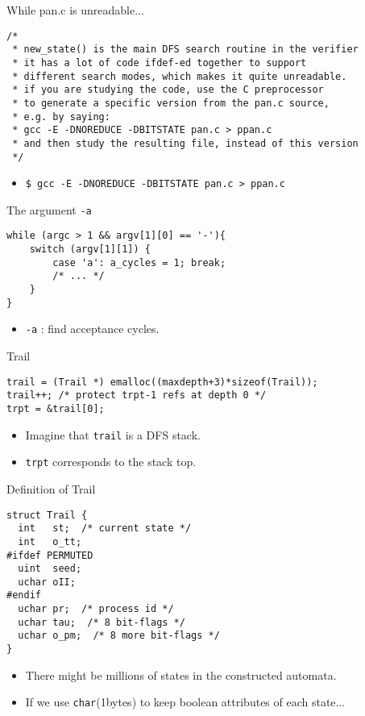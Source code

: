 \documentclass[12pt]{beamer}
\newcommand{\code}[1]{\texttt{#1}}
\begin{document}
\begin{frame}[fragile]{While pan.c is unreadable...}

\begin{lstlisting}[basicstyle=\footnotesize\ttfamily]
/*
 * new_state() is the main DFS search routine in the verifier
 * it has a lot of code ifdef-ed together to support
 * different search modes, which makes it quite unreadable.
 * if you are studying the code, use the C preprocessor
 * to generate a specific version from the pan.c source,
 * e.g. by saying:
 * gcc -E -DNOREDUCE -DBITSTATE pan.c > ppan.c
 * and then study the resulting file, instead of this version
 */\end{lstlisting}
 	\begin{itemize}
 		\item \code{\$ gcc -E -DNOREDUCE -DBITSTATE pan.c > ppan.c}
 	\end{itemize}
\end{frame}


\begin{frame}[fragile]{The argument \code{-a}}
\begin{lstlisting}[basicstyle=\normalsize\ttfamily]
while (argc > 1 && argv[1][0] == '-'){ 
    switch (argv[1][1]) {
        case 'a': a_cycles = 1; break;
        /* ... */
    }
}\end{lstlisting}
 	\begin{itemize}
 		\item \code{-a} : find acceptance cycles.
 	\end{itemize}
\end{frame}  


\begin{frame}[fragile]{Trail}
\begin{lstlisting}[basicstyle=\normalsize\ttfamily]
trail = (Trail *) emalloc((maxdepth+3)*sizeof(Trail));
trail++; /* protect trpt-1 refs at depth 0 */
trpt = &trail[0];
\end{lstlisting}
 	\begin{itemize}
		\item Imagine that \code{trail} is a DFS stack.
 		\item \code{trpt} corresponds to the stack top.
 	\end{itemize}
\end{frame}

\begin{frame}[fragile]{Definition of Trail}
\begin{lstlisting}[basicstyle=\normalsize\ttfamily]
struct Trail {
  int   st;  /* current state */
  int   o_tt;
#ifdef PERMUTED
  uint  seed;
  uchar oII;
#endif
  uchar pr;  /* process id */
  uchar tau;  /* 8 bit-flags */
  uchar o_pm;  /* 8 more bit-flags */
}
\end{lstlisting}
\begin{itemize}
	\item There might be millions of states in the constructed automata.
	\item If we use \code{char}(1bytes) to keep boolean attributes of each state...
\end{itemize}
\end{frame}
\end{document}
